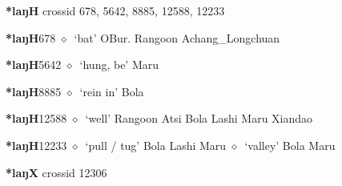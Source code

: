 \textbf{*laŋH}
  {\tiny crossid 678, 5642, 8885, 12588, 12233}
  \begin{list}{}{\leftmargin=1.5em \itemindent=-1.5em}
  \item {\footnotesize \textbf{*laŋH}}{\tiny 678}
         $\diamond$~`bat'
         OBur. 
\hspace{1ex}
         Rangoon 
\hspace{1ex}
         Achang\_Longchuan 
  \item {\footnotesize \textbf{*laŋH}}{\tiny 5642}
\hspace{1ex}
         $\diamond$~`hung, be'
         Maru 
  \item {\footnotesize \textbf{*laŋH}}{\tiny 8885}
\hspace{1ex}
         $\diamond$~`rein in'
         Bola 
  \item {\footnotesize \textbf{*laŋH}}{\tiny 12588}
\hspace{1ex}
         $\diamond$~`well'
         Rangoon 
\hspace{1ex}
         Atsi 
\hspace{1ex}
         Bola 
\hspace{1ex}
         Lashi 
\hspace{1ex}
         Maru 
\hspace{1ex}
         Xiandao 
  \item {\footnotesize \textbf{*laŋH}}{\tiny 12233}
\hspace{1ex}
         $\diamond$~`pull / tug'
         Bola 
\hspace{1ex}
         Lashi 
\hspace{1ex}
         Maru 
\hspace{1ex}
         $\diamond$~`valley'
         Bola 
\hspace{1ex}
         Maru 
  \end{list}
\item
\textbf{*laŋX}
  {\tiny crossid 12306}
